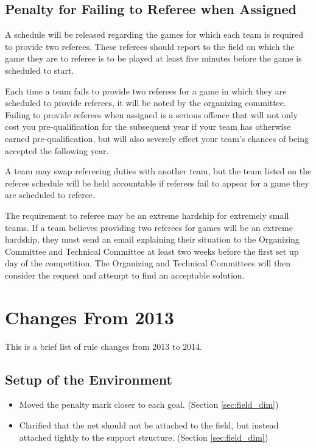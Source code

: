 \documentclass[12pt]{article}
\begin{document}
\subsection{Penalty for Failing to Referee when Assigned}
\label{sec:refPenalty}
A schedule will be released regarding the games for which each team is required to provide two referees.  These referees should report to the field on which the game they are to referee is to be played at least five minutes before the game is scheduled to start.

Each time a team fails to provide two referees for a game in which they are scheduled to provide referees, it will be noted by the organizing committee.  Failing to provide referees when assigned is a serious offence that will not only cost you pre-qualification for the subsequent year if your team has otherwise earned pre-qualification, but will also severely effect your team's chances of being accepted the following year.

A team may swap refereeing duties with another team, but the team listed on the referee schedule will be held accountable if referees fail to appear for a game they are scheduled to referee.

The requirement to referee may be an extreme hardship for extremely small teams.  If a team believes providing two referees for games will be an extreme hardship, they must send an email explaining their situation to the Organizing Committee and Technical Committee at least two weeks before the first set up day of the competition.  The Organizing and Technical Committees will then consider the request and attempt to find an acceptable solution.


\newpage


\section{Changes From 2013}
This is a brief list of rule changes from 2013 to 2014.

\subsection*{Setup of the Environment}
\begin{itemize}
	\item Moved the penalty mark closer to each goal. (Section \ref{sec:field_dim})
	\item Clarified that the net should not be attached to the field, but instead attached tightly to the support structure. (Section \ref{sec:field_dim})
\end{itemize}
\end{document}
